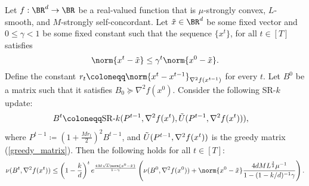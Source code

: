 \begin{lemma}
    Let $f: \BR^d \to \BR$ be a real-valued function that is $\mu$-strongly convex, $L$-smooth, and $M$-strongly self-concordant. Let $\Tilde{x} \in \BR^d$ be some fixed vector and $0 \leq \gamma < 1$ be some fixed constant such that the sequence $\{ x^t \}$, for all $t \in [T]$ satisfies
    \begin{equation}
        \norm{x^t - \Tilde{x}} \leq \gamma^t \norm{x^0 - \Tilde{x}}.
        \label{eq:dist_hypo_1}
    \end{equation}
    Define the constant $r_t \coloneqq \norm{x^t - x^{t-1}}_{\nabla^2 f(x^{t-1})}$ for every $t$. Let $B^0$ be a matrix such that it satisfies $B_0 \succeq \nabla^2 f(x^0)$. Consider the following SR-$k$ update:
    \begin{align*}  
        B^t \coloneqq & \mathrm{SR}\textrm{-}k(P^{t-1}, \nabla^2 f(x^t), \Tilde{U}(P^{t-1}, \nabla^2 f(x^t))),
    \end{align*}
    where $P^{t-1} \coloneqq (1 + \frac{M r_t}{2})^2 B^{t-1}$, 
    and $\Tilde{U}(P^{t-1}, \nabla^2 f(x^t))$ is the greedy matrix (\ref{greedy_matrix}). Then the following holds for all $t \in [T]$:
    \begin{equation}
        \nu(B^t, \nabla^2 f(x^t)) \leq  \left(1 - \frac{k}{d}\right)^t e^ {\frac{4 M \sqrt{L}  \norm{x^0 - \Tilde{x}}}{1 - \gamma} } \left( \nu (B^{0}, \nabla^2 f(x^{0})) + \norm{x^0 - \Tilde{x}} \frac{4 d M L^{\frac{3}{2}} \mu^{-1} }{1 - (1 - k / d)^{-1} \gamma}  \right) .
    \end{equation}
    \label{lemma:srk_recur}
\end{lemma}

